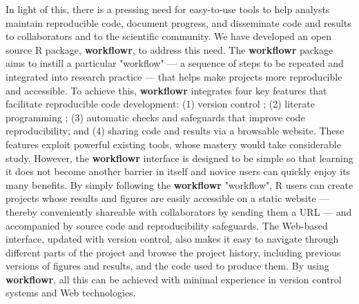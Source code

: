 \documentclass[9pt,a4paper]{extarticle}
\begin{document}
In light of this, there is a pressing need for easy-to-use tools to help
analysts maintain reproducible code, document progress, and disseminate
code and results to collaborators and to the scientific community. We
have developed an open source R \cite{R2019} package, \textbf{workflowr}, to
address this need. The \textbf{workflowr} package aims to instill a particular
"workflow" --- a sequence of steps to be repeated and integrated into
research practice --- that helps make projects more reproducible and
accessible. To achieve this, \textbf{workflowr} integrates four key features that
facilitate reproducible code development: (1) version control
\cite{Loeliger2012, Chacon2014}; (2) literate programming
\cite{Xie2018}; (3) automatic checks and safeguards that improve code
reproducibility; and (4) sharing code and results via a browsable
website. These features exploit powerful existing tools, whose mastery
would take considerable study. However, the \textbf{workflowr} interface is
designed to be simple so that learning it does not become another
barrier in itself and novice users can quickly enjoy its many benefits.
By simply following the \textbf{workflowr} "workflow", R users can create
projects whose results and figures are easily accessible on a static
website --- thereby conveniently shareable with collaborators by sending
them a URL --- and accompanied by source code and reproducibility
safeguards. The Web-based interface, updated with version control, also
makes it easy to navigate through different parts of the project and
browse the project history, including previous versions of figures and
results, and the code used to produce them. By using \textbf{workflowr}, all this
can be achieved with minimal experience in version control systems and
Web technologies.
\end{document}
